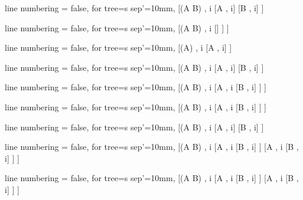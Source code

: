 \documentclass[12pt, fleqn]{article}
\begin{document}
\begin{multicols}{3}
\begin{tableau}
  { line numbering = false,
  for tree={s sep'=10mm},
  }
[(A \supset B) {,} i
	[\neg A {,} i]
	[B {,} i]
]
\end{tableau}

\vspace{1cm}
\begin{tableau}
  { line numbering = false,
  for tree={s sep'=10mm},
  }
[\neg (A \supset B) {,} i
	[\downarrow 
		[A {,} i
			[\neg B {,} i]
		]
	]
]
\end{tableau}

\vspace{1cm}
\begin{tableau}
  { line numbering = false,
  for tree={s sep'=10mm},
  }
[(\neg \neg A) {,} i
	[A {,} i]
]
\end{tableau}

\vspace{1cm}
\begin{tableau}
  { line numbering = false,
  for tree={s sep'=10mm},
  }
[(A \vee B) {,} i
	[A {,} i]
	[B {,} i]
]
\end{tableau}

\vspace{1cm}
\begin{tableau}
  { line numbering = false,
  for tree={s sep'=10mm},
  }
[\neg(A \vee B) {,} i
	[\neg A {,} i
		[\neg B {,} i]
	]
]
\end{tableau}


\vspace{1cm}
\begin{tableau}
  { line numbering = false,
  for tree={s sep'=10mm},
  }
[(A \wedge B) {,} i
	[A {,} i
		[B {,} i]
	]
]
\end{tableau}


\vspace{1cm}
\begin{tableau}
  { line numbering = false,
  for tree={s sep'=10mm},
  }
[\neg(A \wedge B) {,} i
	[\neg A {,} i]
	[\neg B {,} i]
]
\end{tableau}

\vspace{1cm}


\begin{tableau}
  { line numbering = false,
  for tree={s sep'=10mm},
  }
[(A \equiv B) {,} i
	[A {,} i
		[B {,} i]
	]
	[\neg A {,} i
		[\neg B {,} i]
	]
]
\end{tableau}


\vspace{1cm}
\begin{tableau}
  { line numbering = false,
  for tree={s sep'=10mm},
  }
[\neg(A \equiv B) {,} i
	[\neg A {,} i
		[B {,} i]
	]
	[A {,} i
		[\neg B {,} i]
	]
]
\end{tableau}
\end{multicols}
\end{document}
